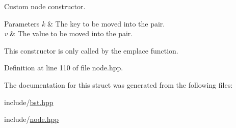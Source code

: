 Custom node constructor. 


\begin{DoxyParams}{Parameters}
{\em k} & The key to be moved into the pair. \\
\hline
{\em v} & The value to be moved into the pair.\\
\hline
\end{DoxyParams}
This constructor is only called by the emplace function. 

Definition at line 110 of file node.\+hpp.



The documentation for this struct was generated from the following files\+:\begin{DoxyCompactItemize}
\item 
include/\hyperlink{bst_8hpp}{bst.\+hpp}\item 
include/\hyperlink{node_8hpp}{node.\+hpp}\end{DoxyCompactItemize}
